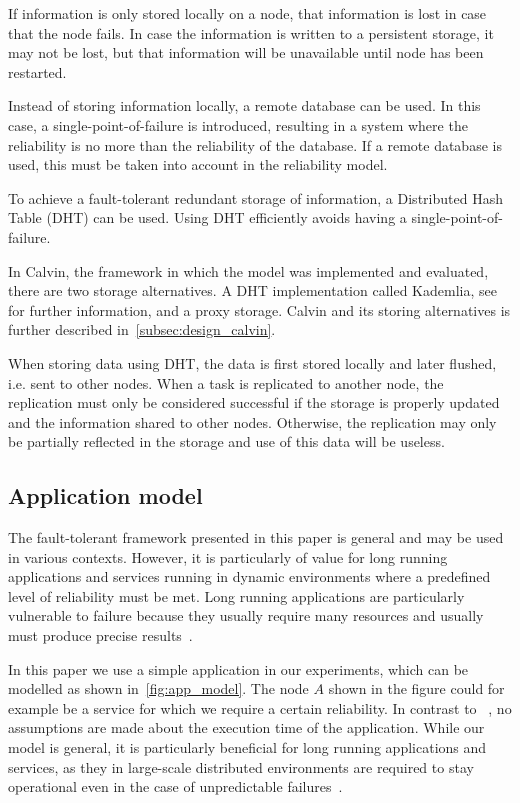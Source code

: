 \documentclass{cslthse-msc}
\begin{document}
If information is only stored locally on a node, that information is lost in case that the node fails. In case the information is written to a persistent storage, it may not be lost, but that information will be unavailable until node has been restarted. 

Instead of storing information locally, a remote database can be used. In this case, a single-point-of-failure is introduced, resulting in a system where the reliability is no more than the reliability of the database. If a remote database is used, this must be taken into account in the reliability model.

To achieve a fault-tolerant redundant storage of information, a Distributed Hash Table (DHT) can be used. Using DHT efficiently avoids having a single-point-of-failure. 

In Calvin, the framework in which the model was implemented and evaluated, there are two storage alternatives. A DHT implementation called Kademlia, see~\cite{kademlia} for further information, and a proxy storage. Calvin and its storing alternatives is further described in~\cref{subsec:design_calvin}.

When storing data using DHT, the data is first stored locally and later flushed, i.e. sent to other nodes. When a task is replicated to another node, the replication must only be considered successful if the storage is properly updated and the information shared to other nodes. Otherwise, the replication may only be partially reflected in the storage and use of this data will be useless. 

\subsection{Application model} \label{subsec:design_app_model}
The fault-tolerant framework presented in this paper is general and may be used in various contexts. However, it is particularly of value for long running applications and services running in dynamic environments where a predefined level of reliability must be met. Long running applications are particularly vulnerable to failure because they usually require many resources and usually must produce precise results~\cite{relGridSystems}.

In this paper we use a simple application in our experiments, which can be modelled as shown in~\cref{fig:app_model}. The node $A$ shown in the figure could for example be a service for which we require a certain reliability. In contrast to ~\cite{algoOptTimeMaxRel, optTaskAllocationForMaxRel, taskAllocation, taskAllocationSwarm, algoMaxRelEndToEndConstraint, algoMinExTime, schedReplicas}, no assumptions are made about the execution time of the application. While our model is general, it is particularly beneficial for long running applications and services, as they in large-scale distributed environments are required to stay operational even in the case of unpredictable failures~\cite{imprRelAdaptRL}.
\end{document}
